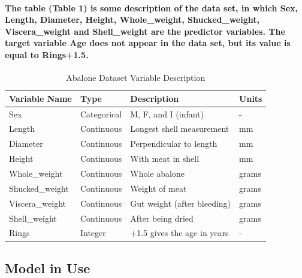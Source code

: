 \documentclass[11pt]{article} %
\begin{document}
\paragraph{The table (Table 1) is some description of the data set, in which Sex, Length, Diameter, Height, Whole\_weight, Shucked\_weight, Viscera\_weight and Shell\_weight are the predictor variables. The target variable Age does not appear in the data set, but its value is equal to Rings+1.5.}
% 
% 
\begin{table}[h]
    \centering
    \begin{tabular}{l l l l}
        \hline
        \textbf{Variable Name} & \textbf{Type} & \textbf{Description}        & \textbf{Units} \\ \hline
        Sex                    & Categorical   & M, F, and I (infant)        & -              \\
        Length                 & Continuous    & Longest shell measurement   & mm             \\
        Diameter               & Continuous    & Perpendicular to length     & mm             \\
        Height                 & Continuous    & With meat in shell          & mm             \\
        Whole\_weight          & Continuous    & Whole abalone               & grams          \\
        Shucked\_weight        & Continuous    & Weight of meat              & grams          \\
        Viscera\_weight        & Continuous    & Gut weight (after bleeding) & grams          \\
        Shell\_weight          & Continuous    & After being dried           & grams          \\
        Rings                  & Integer       & +1.5 gives the age in years & -              \\ \hline
    \end{tabular}
    \caption{Abalone Dataset Variable Description}
    \label{table:abalone_vars}
\end{table}
% 
% 
\subsection{Model in Use}
% 
% 
\end{document}
